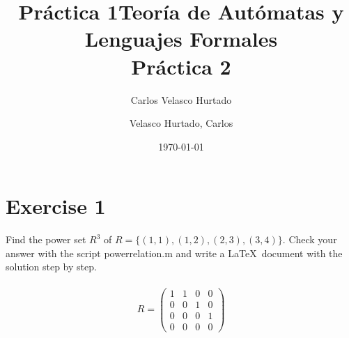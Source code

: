 \documentclass[11pt]{article}
\title{\textbf{Práctica 1}}
\author{Carlos Velasco Hurtado}
\date{}
\title{Teoría de Autómatas y Lenguajes Formales\\[.4\baselineskip]Práctica 2}
\author{Velasco Hurtado, Carlos}
\date{\today}
\begin{document}
\maketitle
\thispagestyle{empty}

\section*{Exercise 1}
Find the power set $R^3$  of $R=\{(1,1),(1,2),(2,3),(3,4)\}$. Check your answer with the script powerrelation.m and write a \LaTeX\, document with the solution step by step.
\\\\
\begin{equation*}
R = 
\begin{pmatrix}
1 & 1 & 0 & 0\\
0 & 0 & 1 & 0\\
0 & 0 & 0 & 1\\
0 & 0 & 0 & 0 
\end{pmatrix}
\end{equation*}
\end{document}
